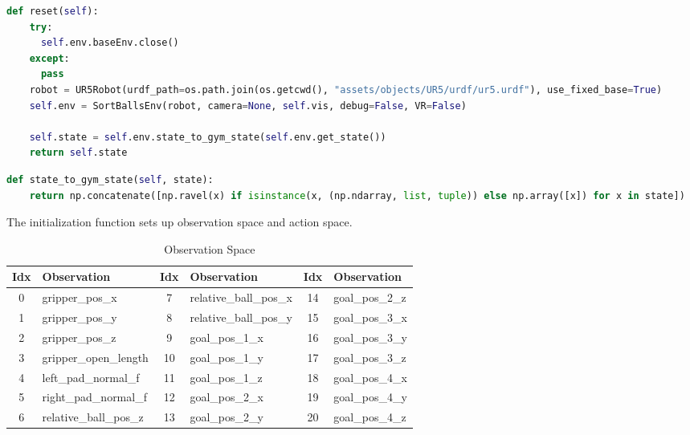 \begin{lstlisting}[language=Python, caption=Gym Wrapper Reset Function, breaklines=true]
def reset(self):
    try:
      self.env.baseEnv.close()
    except:
      pass
    robot = UR5Robot(urdf_path=os.path.join(os.getcwd(), "assets/objects/UR5/urdf/ur5.urdf"), use_fixed_base=True)
    self.env = SortBallsEnv(robot, camera=None, self.vis, debug=False, VR=False)

    self.state = self.env.state_to_gym_state(self.env.get_state())
    return self.state  
\end{lstlisting}

\begin{lstlisting}[language=Python, caption=State to Gym State Function, breaklines=true]
def state_to_gym_state(self, state):
    return np.concatenate([np.ravel(x) if isinstance(x, (np.ndarray, list, tuple)) else np.array([x]) for x in state])
\end{lstlisting}

\bigskip \noindent
The initialization function sets up observation space and action space.
\begin{table}[ht]
  \setlength{\abovecaptionskip}{6pt}
  \centering
  \small
  \begin{tabular}{|c|l|c|l|c|l|}
  \hline
\textbf{Idx} & \textbf{Observation}            & \textbf{Idx} & \textbf{Observation}            & \textbf{Idx} & \textbf{Observation}            \\ \hline
                 0              & gripper\_pos\_x                 & 7             & relative\_ball\_pos\_x          & 14             & goal\_pos\_2\_z                 \\ \hline
               1              & gripper\_pos\_y                 & 8             & relative\_ball\_pos\_y          & 15             & goal\_pos\_3\_x                 \\ \hline
                 2              & gripper\_pos\_z                 & 9             & goal\_pos\_1\_x                 & 16             & goal\_pos\_3\_y                 \\ \hline
               3             & gripper\_open\_length           & 10             & goal\_pos\_1\_y                 & 17             & goal\_pos\_3\_z                 \\ \hline
                 4             & left\_pad\_normal\_f        & 11             & goal\_pos\_1\_z                 & 18             & goal\_pos\_4\_x                 \\ \hline
                5             & right\_pad\_normal\_f       & 12             & goal\_pos\_2\_x                 & 19             & goal\_pos\_4\_y                 \\ \hline
 6             & relative\_ball\_pos\_z          & 13             & goal\_pos\_2\_y                 & 20             & goal\_pos\_4\_z                 \\ \hline
  \end{tabular}
  \caption{Observation Space}
  \end{table}

